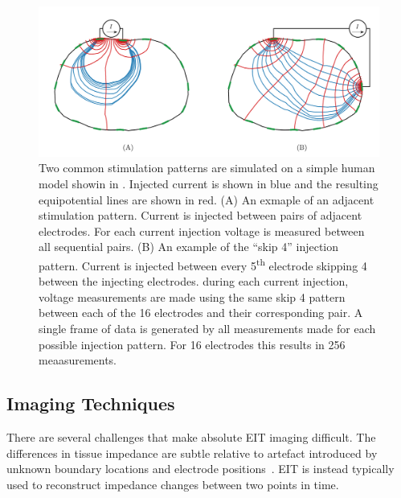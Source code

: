 \begin{figure}
    \includegraphics[width=\textwidth]{chapter2-background/imgs/common_stim_meas_patterns.pdf}
    \caption[Adjacent and "skip 4" stimulation patterns]{\label{fig:stim_meas_bkgnd} 
    Two common stimulation patterns are simulated on a simple human model showin in 
    . Injected current is shown in blue and the resulting equipotential 
    lines are shown in red.
    (A) An exmaple of an adjacent stimulation pattern. Current is injected between 
    pairs of adjacent electrodes. For each current injection voltage is 
    measured between all sequential pairs. 
    (B) An example of the ``skip 4'' injection pattern. Current is injected between every
    5\textsuperscript{th} electrode skipping 4 between the injecting electrodes. 
    during each current injection, voltage measurements are made using the same skip 4 
    pattern between each of the 16 electrodes and their corresponding pair. 
    A single frame of data is generated by all measurements made for each possible injection
    pattern. For 16 electrodes this results in 256 meaasurements.}
 \end{figure}


\subsection{Imaging Techniques}
There are several challenges that make absolute EIT imaging difficult. 
The differences in tissue impedance are subtle relative to artefact introduced 
by unknown boundary locations and electrode 
positions~\parencite{adler_why_2015,adler_electrical_2017,nissinen_compensation_2009}. 
EIT is instead typically used to reconstruct impedance changes between two points in time.

